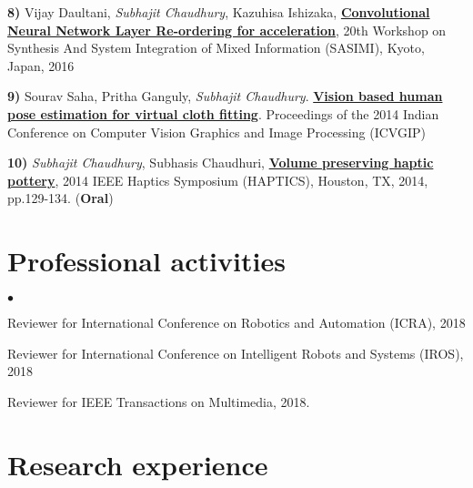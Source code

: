 \documentclass[margin,line]{res}
\newenvironment{list2}{
  \begin{list}{$\bullet$}{%
      \setlength{\itemsep}{0in}
      \setlength{\parsep}{0in} \setlength{\parskip}{0in}
      \setlength{\topsep}{0in} \setlength{\partopsep}{0in} 
      \setlength{\leftmargin}{0.2in}}}{\end{list}}
\begin{document}
\begin{resume}
\textbf{8)} Vijay Daultani, \textit{Subhajit Chaudhury}, Kazuhisa Ishizaka, \textbf{\href{https://subhajitchaudhury.github.io/data/SASIMI_paper.pdf}{Convolutional Neural Network Layer Re-ordering for acceleration}}, 20th Workshop on Synthesis And System Integration of Mixed Information (SASIMI), Kyoto, Japan, 2016 

\textbf{9)} Sourav Saha, Pritha Ganguly, \textit{Subhajit Chaudhury}. \textbf{\href{https://subhajitchaudhury.github.io/data/icvgip_final_version.pdf}{Vision based human pose estimation for virtual cloth fitting}}. Proceedings of the 2014 Indian Conference on Computer Vision Graphics and Image Processing (ICVGIP)%

\textbf{10)} \textit{Subhajit Chaudhury}, Subhasis Chaudhuri, \textbf{\href{https://subhajitchaudhury.github.io/data/chaudhury2014.pdf}{Volume preserving haptic pottery}}, 2014 IEEE Haptics Symposium (HAPTICS), Houston, TX, 2014, pp.129-134. (\textbf{Oral})


\section{\sc Professional activities} 

\begin{list2}
	
	
	\item Reviewer for International Conference on Robotics and Automation (ICRA), 2018 
	
	\item Reviewer for International Conference on Intelligent Robots and Systems (IROS), 2018 
	
	\item Reviewer for IEEE Transactions on Multimedia, 2018.
	
\end{list2}

\section{\sc Research experience} 


\end{resume}
\end{document}
